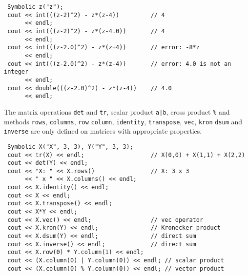 \documentclass[12pt,a4paper]{report}
\begin{document}
\begin{verbatim}
 Symbolic z("z");
 cout << int(((z-2)^2) - z*(z-4))         // 4
      << endl;
 cout << int(((z-2)^2) - z*(z-4.0))       // 4
      << endl;
 cout << int(((z-2.0)^2) - z*(z+4))       // error: -8*z
      << endl;
 cout << int(((z-2.0)^2) - z*(z-4))       // error: 4.0 is not an integer
      << endl;
 cout << double(((z-2.0)^2) - z*(z-4))    // 4.0
      << endl;
\end{verbatim}

The matrix operations \verb|det| and \verb|tr|, scalar product \verb$a|b$,
cross product \verb|%| and methods \verb|rows|, \verb|columns|, \verb|row|
\verb|column|, \verb|identity|, \verb|transpose|, \verb|vec|, \verb|kron|
\verb|dsum| and \verb|inverse| are only defined on matrices with
appropriate properties.

\begin{verbatim}
 Symbolic X("X", 3, 3), Y("Y", 3, 3);
 cout << tr(X) << endl;                   // X(0,0) + X(1,1) + X(2,2)
 cout << det(Y) << endl;
 cout << "X: " << X.rows()                // X: 3 x 3
      << " x " << X.columns() << endl;
 cout << X.identity() << endl;
 cout << X << endl;
 cout << X.transpose() << endl;
 cout << X*Y << endl;
 cout << X.vec() << endl;                 // vec operator
 cout << X.kron(Y) << endl;               // Kronecker product
 cout << X.dsum(Y) << endl;               // direct sum
 cout << X.inverse() << endl;             // direct sum
 cout << X.row(0) * Y.column(1) << endl;
 cout << (X.column(0) | Y.column(0)) << endl; // scalar product
 cout << (X.column(0) % Y.column(0)) << endl; // vector product
\end{verbatim}
\end{document}
